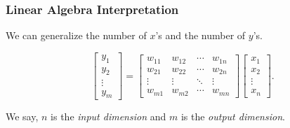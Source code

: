 \documentclass[main.tex]{subfiles}
\begin{document}
\begin{frame}
  \frametitle{Linear Algebra Interpretation}
  We can generalize the number of \(x\)'s and the number of \(y\)'s.

  \[
    \begin{bmatrix}
      y_1 \\ y_2 \\ \vdots \\ y_m
    \end{bmatrix}
    =
    \begin{bmatrix}
      w_{11} & w_{12} & \cdots & w_{1n} \\
      w_{21} & w_{22} & \cdots & w_{2n} \\
      \vdots & \vdots & \ddots & \vdots \\
      w_{m1} & w_{m2} & \cdots & w_{mn}
    \end{bmatrix}
    \begin{bmatrix}
      x_1 \\ x_2 \\ \vdots \\ x_n
    \end{bmatrix}.
  \]

  \pause
  We say, \(n\) is the \emph{input dimension} and \(m\) is the \emph{output dimension}.
\end{frame}
\end{document}
